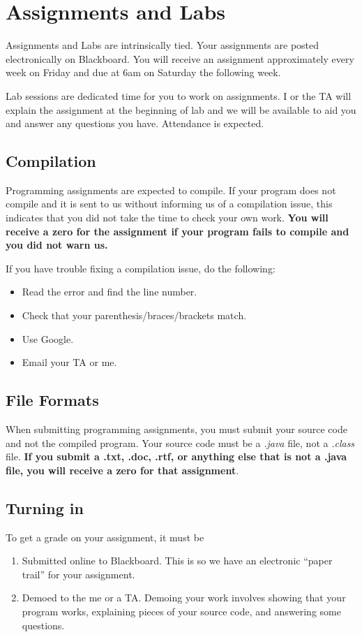 \documentclass[10pt, letter]{article}
\begin{document}
\section{Assignments and Labs}
Assignments and Labs are intrinsically tied.
Your assignments are posted electronically on Blackboard.
You will receive an assignment approximately every week on Friday and due at 6am on Saturday the following week.

Lab sessions are dedicated time for you to work on assignments.
I or the TA will explain the assignment at the beginning of lab and we will be available to aid you and answer any questions you have.
Attendance is expected.


\subsection*{Compilation}
Programming assignments are expected to compile.  If your program does not compile and it is sent to us without informing us of a compilation issue, this indicates that you did not take the time to check your own work.  \textbf{You will receive a zero for the assignment if your program fails to compile and you did not warn us.}

If you have trouble fixing a compilation issue, do the following:
{\footnotesize
	\begin{itemize}
		\item Read the error and find the line number.
		\item Check that your parenthesis/braces/brackets match.
		\item Use Google.
		\item Email your TA or me.
	\end{itemize}
}
\subsection*{File Formats}
When submitting programming assignments, you must submit your source code and not the compiled program.
Your source code must be a \emph{.java} file, not a \emph{.class} file.
\textbf{If you submit a .txt, .doc, .rtf, or anything else that is not a .java file, you will receive a zero for that assignment}.




\subsection*{Turning in}
To get a grade on your assignment, it must be 
\begin{enumerate}
	\item Submitted online to Blackboard.  This is so we have an electronic ``paper trail'' for your assignment.
	\item Demoed to the me or a TA.  Demoing your work involves showing that your program works, explaining pieces of your source code, and answering some questions.
\end{enumerate}
\end{document}
